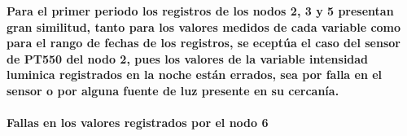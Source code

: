 \documentclass[11pt]{article}
\begin{document}
    \begin{center}
    \end{center}
    { \hspace*{\fill} \\}
    
    \begin{center}
    \end{center}
    { \hspace*{\fill} \\}
    
    \begin{center}
    \end{center}
    { \hspace*{\fill} \\}
    
    \begin{center}
    \end{center}
    { \hspace*{\fill} \\}
    
    \paragraph{Para el primer periodo los registros de los nodos 2, 3 y 5
presentan gran similitud, tanto para los valores medidos de cada
variable como para el rango de fechas de los registros, se eceptúa el
caso del sensor de PT550 del nodo 2, pues los valores de la variable
intensidad luminica registrados en la noche están errados, sea por falla
en el sensor o por alguna fuente de luz presente en su
cercanía.}\label{para-el-primer-periodo-los-registros-de-los-nodos-2-3-y-5-presentan-gran-similitud-tanto-para-los-valores-medidos-de-cada-variable-como-para-el-rango-de-fechas-de-los-registros-se-eceptuxfaa-el-caso-del-sensor-de-pt550-del-nodo-2-pues-los-valores-de-la-variable-intensidad-luminica-registrados-en-la-noche-estuxe1n-errados-sea-por-falla-en-el-sensor-o-por-alguna-fuente-de-luz-presente-en-su-cercanuxeda.}

\paragraph{Fallas en los valores registrados por el nodo
6}\label{fallas-en-los-valores-registrados-por-el-nodo-6}
\end{document}

